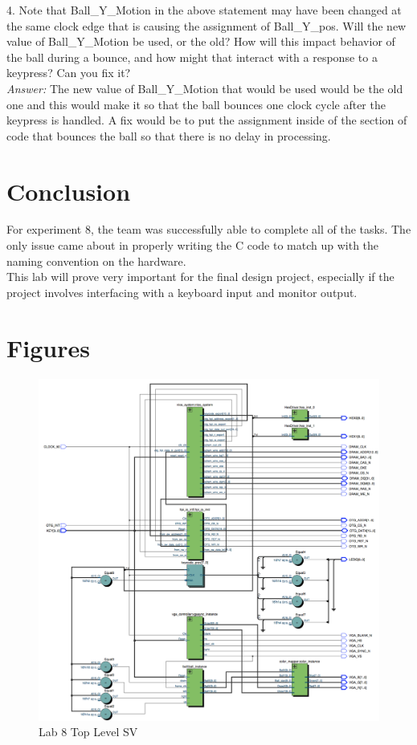 \documentclass[journal, twocolumn, final,11pt,letterpaper]{IEEEtran}
\begin{document}
4.  Note that Ball\_Y\_Motion in the above statement may have been changed at the same clock edge that is causing the assignment of Ball\_Y\_pos.  Will the new value of Ball\_Y\_Motion be used, or the old?  How will this impact behavior of the ball during a bounce, and how might that interact with a response to a keypress?  Can you fix it?\\

\textit{Answer:} The new value of Ball\_Y\_Motion that would be used would be the old one and this would make it so that the ball bounces one clock cycle after the keypress is handled. A fix would be to put the assignment inside of the section of code that bounces the ball so that there is no delay in processing. \\

\section{Conclusion}
For experiment 8, the team was successfully able to complete all of the tasks.  The only issue came about in properly writing the C code to match up with the naming convention on the hardware.  \\

This lab will prove very important for the final design project, especially if the project involves interfacing with a keyboard input and monitor output.  


\clearpage
\onecolumn
\section{Figures}

\begin{figure} [H]
	\centering
	\includegraphics[scale=.5]{top_level_diagram.png}
	\caption{Lab 8 Top Level SV\label{fig:top-level}}
\end{figure}
\end{document}
